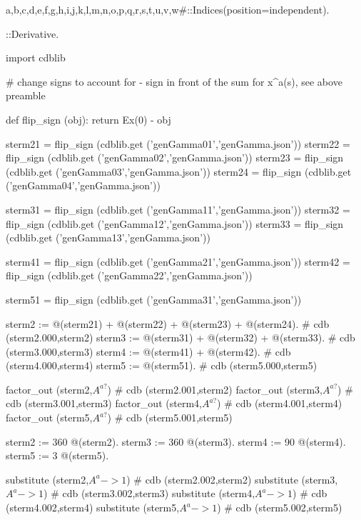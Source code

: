 \documentclass[12pt]{cdblatex}
\begin{document}
\begin{cadabra}
   {a,b,c,d,e,f,g,h,i,j,k,l,m,n,o,p,q,r,s,t,u,v,w#}::Indices(position=independent).

   \nabla{#}::Derivative.

   import cdblib

   # change signs to account for - sign in front of the sum for x^a(s), see above preamble

   def flip_sign (obj):
       return Ex(0) - obj

   sterm21 = flip_sign (cdblib.get ('genGamma01','genGamma.json'))
   sterm22 = flip_sign (cdblib.get ('genGamma02','genGamma.json'))
   sterm23 = flip_sign (cdblib.get ('genGamma03','genGamma.json'))
   sterm24 = flip_sign (cdblib.get ('genGamma04','genGamma.json'))

   sterm31 = flip_sign (cdblib.get ('genGamma11','genGamma.json'))
   sterm32 = flip_sign (cdblib.get ('genGamma12','genGamma.json'))
   sterm33 = flip_sign (cdblib.get ('genGamma13','genGamma.json'))

   sterm41 = flip_sign (cdblib.get ('genGamma21','genGamma.json'))
   sterm42 = flip_sign (cdblib.get ('genGamma22','genGamma.json'))

   sterm51 = flip_sign (cdblib.get ('genGamma31','genGamma.json'))

   sterm2 := @(sterm21) + @(sterm22) + @(sterm23) + @(sterm24).  # cdb (sterm2.000,sterm2)
   sterm3 := @(sterm31) + @(sterm32) + @(sterm33).               # cdb (sterm3.000,sterm3)
   sterm4 := @(sterm41) + @(sterm42).                            # cdb (sterm4.000,sterm4)
   sterm5 := @(sterm51).                                         # cdb (sterm5.000,sterm5)

   factor_out (sterm2,$A^{a?}$)                                  # cdb (sterm2.001,sterm2)
   factor_out (sterm3,$A^{a?}$)                                  # cdb (sterm3.001,sterm3)
   factor_out (sterm4,$A^{a?}$)                                  # cdb (sterm4.001,sterm4)
   factor_out (sterm5,$A^{a?}$)                                  # cdb (sterm5.001,sterm5)

   sterm2 := 360 @(sterm2).
   sterm3 := 360 @(sterm3).
   sterm4 :=  90 @(sterm4).
   sterm5 :=   3 @(sterm5).

   substitute (sterm2,$A^{a}->1$)                                # cdb (sterm2.002,sterm2)
   substitute (sterm3,$A^{a}->1$)                                # cdb (sterm3.002,sterm3)
   substitute (sterm4,$A^{a}->1$)                                # cdb (sterm4.002,sterm4)
   substitute (sterm5,$A^{a}->1$)                                # cdb (sterm5.002,sterm5)

\end{cadabra}
\end{document}
